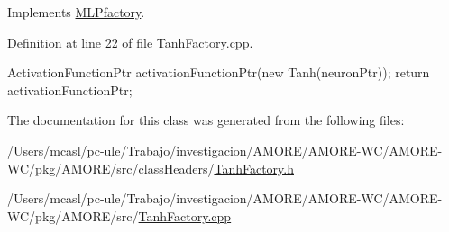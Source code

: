 Implements \hyperlink{class_m_l_pfactory_a92109ea285be7dd847d359a1ade9064a}{MLPfactory}.



Definition at line 22 of file TanhFactory.cpp.


\begin{DoxyCode}
{
  ActivationFunctionPtr activationFunctionPtr(new Tanh(neuronPtr));
  return activationFunctionPtr;
}
\end{DoxyCode}


The documentation for this class was generated from the following files:\begin{DoxyCompactItemize}
\item 
/Users/mcasl/pc-\/ule/Trabajo/investigacion/AMORE/AMORE-\/WC/AMORE-\/WC/pkg/AMORE/src/classHeaders/\hyperlink{_tanh_factory_8h}{TanhFactory.h}\item 
/Users/mcasl/pc-\/ule/Trabajo/investigacion/AMORE/AMORE-\/WC/AMORE-\/WC/pkg/AMORE/src/\hyperlink{_tanh_factory_8cpp}{TanhFactory.cpp}\end{DoxyCompactItemize}
